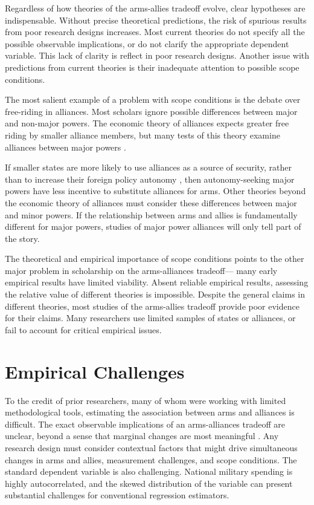 \documentclass[12pt]{article}
\begin{document}
Regardless of how theories of the arms-allies tradeoff evolve, clear hypotheses are indispensable. Without precise theoretical predictions, the risk of spurious results from poor research designs increases. Most current theories do not specify all the possible observable implications, or do not clarify the appropriate dependent variable. This lack of clarity is reflect in poor research designs. Another issue with predictions from current theories is their inadequate attention to possible scope conditions. 

The most salient example of a problem with scope conditions is the debate over free-riding in alliances. Most scholars ignore possible differences between major and non-major powers. The economic theory of alliances expects greater free riding by smaller alliance members, but many tests of this theory examine alliances between major powers \citep{Thies1987, ConybeareSandler1990, Siroky2012}. 

If smaller states are more likely to use alliances as a source of security, rather than to increase their foreign policy autonomy \citep{Morrow1991}, then autonomy-seeking major powers have less incentive to substitute alliances for arms. Other theories beyond the economic theory of alliances must consider these differences between major and minor powers. If the relationship between arms and allies is fundamentally different for major powers, studies of major power alliances will only tell part of the story.  


The theoretical and empirical importance of scope conditions points to the other major problem in scholarship on the arms-alliances tradeoff--- many early empirical results have limited viability. Absent reliable empirical results, assessing the relative value of different theories is impossible. Despite the general claims in different theories, most studies of the arms-allies tradeoff provide poor evidence for their claims. Many researchers use limited samples of states or alliances, or fail to account for critical empirical issues.   


\section*{Empirical Challenges}

To the credit of prior researchers, many of whom were working with limited methodological tools, estimating the association between arms and alliances is difficult. The exact observable implications of an arms-alliances tradeoff are unclear, beyond a sense that marginal changes are most meaningful \citep{Morrow2000, Starr2000}. Any research design must consider contextual factors that might drive simultaneous changes in arms and allies, measurement challenges, and scope conditions. The standard dependent variable is also challenging. National military spending is highly autocorrelated, and the skewed distribution of the variable can present substantial challenges for conventional regression estimators. 
\end{document}
